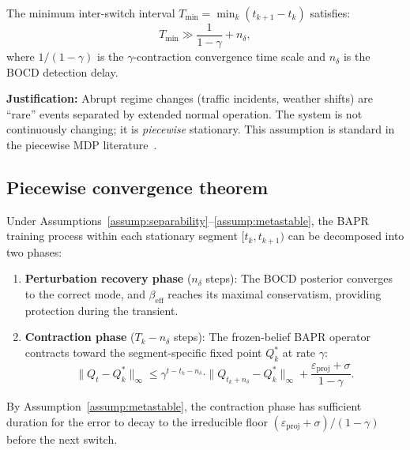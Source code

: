 \begin{assumption}
    \label{assump:metastable}
    The minimum inter-switch interval $T_{\min} = \min_k (t_{k+1} - t_k)$ satisfies:
    \begin{equation}
        T_{\min} \gg \frac{1}{1-\gamma} + n_\delta,
    \end{equation}
    where $1/(1-\gamma)$ is the $\gamma$-contraction convergence time scale and $n_\delta$ is the BOCD detection delay.
    
    \textbf{Justification:} Abrupt regime changes (traffic incidents, weather shifts) are ``rare'' events separated by extended normal operation. The system is not continuously changing; it is \emph{piecewise} stationary. This assumption is standard in the piecewise MDP literature~\cite{Padakandla2020Survey, Lecarpentier2019NonStationary}.
\end{assumption}

\subsection{Piecewise convergence theorem}

\begin{theorem}
    \label{thm:piecewise_convergence}
    Under Assumptions~\ref{assump:separability}--\ref{assump:metastable}, the BAPR training process within each stationary segment $[t_k, t_{k+1})$ can be decomposed into two phases:
    \begin{enumerate}
        \item \textbf{Perturbation recovery phase} ($n_\delta$ steps): The BOCD posterior converges to the correct mode, and $\beta_{\text{eff}}$ reaches its maximal conservatism, providing protection during the transient.
        \item \textbf{Contraction phase} ($T_k - n_\delta$ steps): The frozen-belief BAPR operator contracts toward the segment-specific fixed point $Q^*_k$ at rate $\gamma$:
        \begin{equation}
            \|Q_t - Q^*_k\|_\infty \le \gamma^{t - t_k - n_\delta} \cdot \|Q_{t_k + n_\delta} - Q^*_k\|_\infty + \frac{\varepsilon_{\text{proj}} + \sigma}{1-\gamma}.
        \end{equation}
    \end{enumerate}
    By Assumption~\ref{assump:metastable}, the contraction phase has sufficient duration for the error to decay to the irreducible floor $(\varepsilon_{\text{proj}} + \sigma)/(1-\gamma)$ before the next switch.
\end{theorem}

